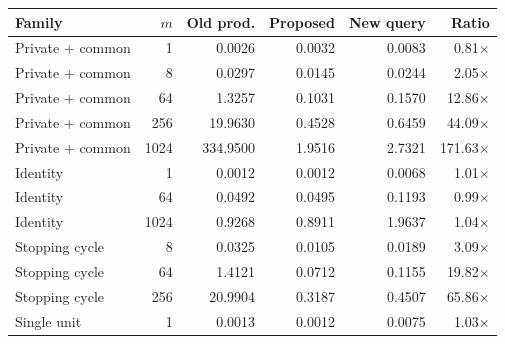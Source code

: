 \begin{tabular}{lrrrrr}
\toprule
Family & $m$ & Old prod. & Proposed & New query & Ratio\\
\midrule
Private + common & 1 & 0.0026 & 0.0032 & 0.0083 & 0.81$\times$\\
Private + common & 8 & 0.0297 & 0.0145 & 0.0244 & 2.05$\times$\\
Private + common & 64 & 1.3257 & 0.1031 & 0.1570 & 12.86$\times$\\
Private + common & 256 & 19.9630 & 0.4528 & 0.6459 & 44.09$\times$\\
Private + common & 1024 & 334.9500 & 1.9516 & 2.7321 & 171.63$\times$\\
Identity & 1 & 0.0012 & 0.0012 & 0.0068 & 1.01$\times$\\
Identity & 64 & 0.0492 & 0.0495 & 0.1193 & 0.99$\times$\\
Identity & 1024 & 0.9268 & 0.8911 & 1.9637 & 1.04$\times$\\
Stopping cycle & 8 & 0.0325 & 0.0105 & 0.0189 & 3.09$\times$\\
Stopping cycle & 64 & 1.4121 & 0.0712 & 0.1155 & 19.82$\times$\\
Stopping cycle & 256 & 20.9904 & 0.3187 & 0.4507 & 65.86$\times$\\
Single unit & 1 & 0.0013 & 0.0012 & 0.0075 & 1.03$\times$\\
\bottomrule
\end{tabular}
